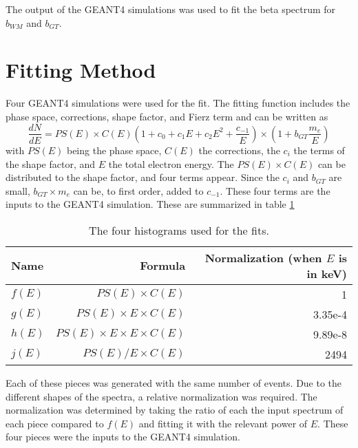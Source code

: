 \documentclass[../MaxHughesThesis.tex]{subfiles}
\begin{document}
The output of the GEANT4 simulations was used to fit the beta spectrum for $b_{WM}$ and $b_{GT}$.

\section{Fitting Method}
Four GEANT4 simulations were used for the fit.
The fitting function includes the phase space, corrections, shape factor, and Fierz term and can be written as
\begin{equation}
	\frac{dN}{dE}= PS(E) \times C(E) (1 + c_{0} + c_{1} E + c_{2} E^{2} + \frac{c_{-1}}{E}) \times (1 + b_{GT}\frac{m_{e}}{E})
	\label{eq:betaspecwshape}
\end{equation}
with $PS(E)$ being the phase space, $C(E)$ the corrections, the $c_{i}$ the terms of the shape factor, and $E$ the total electron energy. 
The $PS(E)\times C(E)$ can be distributed to the shape factor, and four terms appear.
Since the $c_{i}$ and $b_{GT}$ are small, $b_{GT} \times m_{e}$ can be, to first order, added to $c_{-1}$. 
These four terms are the inputs to the GEANT4 simulation.
These are summarized in table \ref{tab:4histfit}

\begin{table}[!hbt]
	\centering
	\caption{The four histograms used for the fits.}
		\begin{tabular}{lrr}
		Name & Formula & Normalization (when $E$ is in keV) \\ \hline
		$f(E)$ & $PS(E) \times C(E)$ & 1 \\
		$g(E)$ & $PS(E) \times E \times C(E)$ & 3.35e-4 \\
		$h(E)$ &  $PS(E)  \times E \times E \times C(E)$ & 9.89e-8 \\
		$j(E)$ &  $PS(E)/E \times C(E)$ & 2494 
		\end{tabular}
		\label{tab:4histfit}
\end{table}

Each of these pieces was generated with the same number of events.
Due to the different shapes of the spectra, a relative normalization was required.
The normalization was determined by taking the ratio of each the input spectrum of each piece compared to $f(E)$ and fitting it with the relevant power of $E$. 
These four pieces were the inputs to the GEANT4 simulation.
\end{document}
